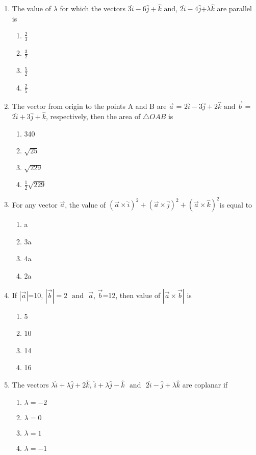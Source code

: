 \documentclass{article}
\providecommand{\abs}[1]{\left\vert#1\right\vert}
\begin{document}
\begin{enumerate}[resume]
\item The value of $\lambda$ for which the vectors $3\hat{i}-6\hat{j}+\hat{k}$ $\text{and}$,  $2\hat{i}-4\hat{j}$+$\lambda\hat{k}$ are parallel is
	\begin{enumerate}
\item $\frac{2}{3}$
\item $\frac{3}{2}$
\item $\frac{5}{2}$
\item $\frac{2}{5}$
	\end{enumerate}	

\item The vector from origin to the points A and B are $\vec{a}$ = $2\hat{i}-3\hat{j}+2\hat{k}$ $\text{and}$  $\vec{b}$ = $2\hat{i}+3\hat{j}+\hat{k}$, respectively, then the area of $\triangle {OAB}$ is
	\begin{enumerate}
\item 340 
\item $\sqrt{25}$
\item $\sqrt{229}$
\item $\frac{1}{2}\sqrt{229}$
\end{enumerate}


\item For any vector $\vec{a}$, the value of $(\vec{a}\times\hat{i})^2+(\vec{a}\times\hat{j})^2 + (\vec{a}\times\hat{k})^2$is equal to 
	\begin{enumerate}
\item a 
\item 3a
\item 4a
\item 2a
\end{enumerate}


\item If $\abs{\vec{a}}$=10, $\abs{\vec{b}}=2$ $\text{ and }$  $\vec{a}$, $\vec{b}$=12, then value of $\abs{\vec{a}\times\vec{b}}$ is
	\begin{enumerate}
\item 5 
\item 10 
\item 14 
\item 16
\end{enumerate}


\item The vectors $\lambda\hat{i}+\lambda\hat{j}+2\hat{k}$, $\hat{i}+\lambda\hat{j}-\hat{k}$ $\text{ and }$ $2\hat{i}-\hat{j}+\lambda\hat{k}$ are coplanar if
	\begin{enumerate}
\item	$\lambda=-2$
\item $\lambda=0$
\item $\lambda=1$
\item	$\lambda=-1$
\end{enumerate}



\end{enumerate}
\end{document}
